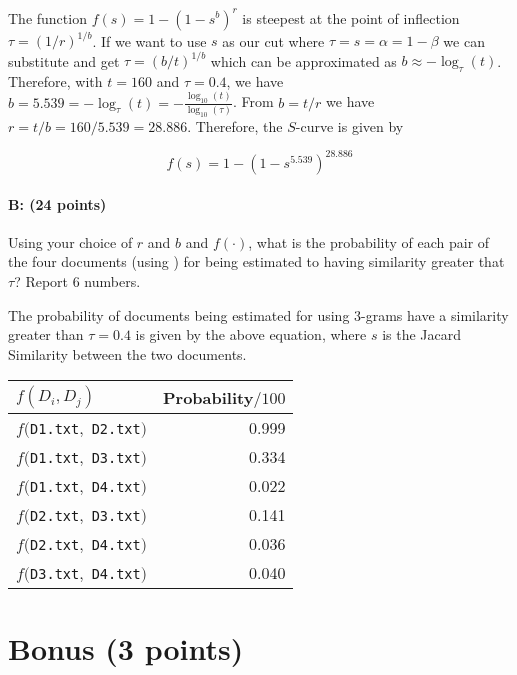 \documentclass[11pt]{article}
\begin{document}
The function $f(s) = 1 - \left( 1 - s^{b}\right)^{r}$ is steepest at the point of inflection $\tau = (1/r)^{1/b}$. If we want to use $s$ as our cut where $\tau = s = \alpha = 1-\beta$ we can substitute and get $\tau = (b/t)^{1/b}$ which can be approximated as $b \approx -\log_{\tau}(t)$. Therefore, with $t = 160$ and $\tau = 0.4$, we have $b = 5.539 = -\log_{\tau}(t) = -\frac{\log_{10}(t)}{\log_{10}(\tau)}$. From $b = t/r$ we have $r = t/b = 160/5.539 = 28.886$. Therefore, the $S$-curve is given by

\[
    f(s) = 1 - \left( 1 - s^{5.539}\right)^{28.886}
\]

\paragraph{B: (24 points)}
Using your choice of $r$ and $b$ and $f(\cdot)$, what is the probability of each pair of the four documents (using \s{[G2]}) for being estimated to having similarity greater that $\tau$?  
Report $6$ numbers.  

The probability of documents being estimated for using 3-grams have a similarity greater than $\tau = 0.4$ is given by the above equation, where $s$ is the Jacard Similarity between the two documents.

\begin{table}[H]
\centering
\begin{tabular}{lr}
\hline\hline
$f(D_{i}, D_{j})$ & Probability$/100$\\
\hline
$f(${\tt D1.txt}$,$ {\tt D2.txt}$)$ & 0.999\\
$f(${\tt D1.txt}$,$ {\tt D3.txt}$)$ & 0.334\\
$f(${\tt D1.txt}$,$ {\tt D4.txt}$)$ & 0.022\\
$f(${\tt D2.txt}$,$ {\tt D3.txt}$)$ & 0.141\\
$f(${\tt D2.txt}$,$ {\tt D4.txt}$)$ & 0.036\\
$f(${\tt D3.txt}$,$ {\tt D4.txt}$)$ & 0.040\\
\hline
\end{tabular}
\end{table}




\section{Bonus (3 points)}
\end{document}
